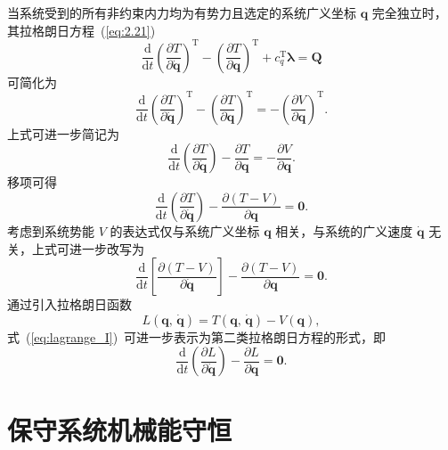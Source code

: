 当系统受到的所有非约束内力均为有势力且选定的系统广义坐标 $\boldsymbol{q}$ 完全独立时，其拉格朗日方程~(\ref{eq:2.21})
\begin{equation*}
\frac{\mathrm{d}}{\mathrm{d}t}\!\left(\frac{\partial T}{\partial \dot{\boldsymbol{q}}}\right)^{\!\mathrm{T}} - \left(\frac{\partial T}{\partial \boldsymbol{q}}\right)^{\!\mathrm{T}} + c_q^{\mathrm{T}} \boldsymbol{\lambda} = \boldsymbol{Q}
\end{equation*}
可简化为
\begin{equation}\label{eq:2.24}
\frac{\mathrm{d}}{\mathrm{d}t}\!\left(\frac{\partial T}{\partial \dot{\boldsymbol{q}}}\right)^{\!\mathrm{T}} - \left(\frac{\partial T}{\partial \boldsymbol{q}}\right)^{\!\mathrm{T}} = -\left(\frac{\partial V}{\partial \boldsymbol{q}}\right)^{\!\mathrm{T}}.
\end{equation}
上式可进一步简记为
\begin{equation}\label{eq:2.25}
\frac{\mathrm{d}}{\mathrm{d}t}\!\left(\frac{\partial T}{\partial \dot{\boldsymbol{q}}}\right) - \frac{\partial T}{\partial \boldsymbol{q}} = -\frac{\partial V}{\partial \boldsymbol{q}}.
\end{equation}
移项可得
\begin{equation}\label{eq:2.26}
\frac{\mathrm{d}}{\mathrm{d}t}\!\left(\frac{\partial T}{\partial \dot{\boldsymbol{q}}}\right) - \frac{\partial (T - V)}{\partial \boldsymbol{q}} = \boldsymbol{0}.
\end{equation}
考虑到系统势能 $V$ 的表达式仅与系统广义坐标 $\boldsymbol{q}$ 相关，与系统的广义速度 $\dot{\boldsymbol{q}}$ 无关，上式可进一步改写为
\begin{equation}\tag{I}\label{eq:lagrange_I}
\frac{\mathrm{d}}{\mathrm{d}t}\!\left[\frac{\partial (T - V)}{\partial \dot{\boldsymbol{q}}}\right] - \frac{\partial (T - V)}{\partial \boldsymbol{q}} = \boldsymbol{0}.
\end{equation}
通过引入拉格朗日函数
\begin{equation}\label{eq:2.27}
L(\boldsymbol{q},\, \dot{\boldsymbol{q}}) = T(\boldsymbol{q},\, \dot{\boldsymbol{q}}) - V(\boldsymbol{q}),
\end{equation}
式~(\ref{eq:lagrange_I})~可进一步表示为第二类拉格朗日方程的形式，即
\begin{equation}\label{eq:2.28}
\boxed{\frac{\mathrm{d}}{\mathrm{d}t}\!\left(\frac{\partial L}{\partial \dot{\boldsymbol{q}}}\right) - \frac{\partial L}{\partial \boldsymbol{q}} = \boldsymbol{0}.}
\end{equation}

\section{保守系统机械能守恒}

